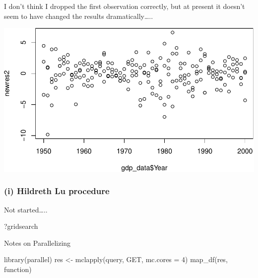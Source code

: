 \documentclass[11pt,]{article}
\newenvironment{Shaded}{\begin{snugshade}}{\end{snugshade}}
\newcommand{\KeywordTok}[1]{\textcolor[rgb]{0.13,0.29,0.53}{\textbf{#1}}}
\newcommand{\StringTok}[1]{\textcolor[rgb]{0.31,0.60,0.02}{#1}}
\newcommand{\CommentTok}[1]{\textcolor[rgb]{0.56,0.35,0.01}{\textit{#1}}}
\newcommand{\OperatorTok}[1]{\textcolor[rgb]{0.81,0.36,0.00}{\textbf{#1}}}
\newcommand{\NormalTok}[1]{#1}
\begin{document}
\begin{Shaded}
\end{Shaded}

I don't think I dropped the first observation correctly, but at present
it doesn't seem to have changed the results dramatically\ldots{}..

\begin{Shaded}
\end{Shaded}

\includegraphics{ps4_code_files/figure-latex/plot CO results-1.pdf}

\subsubsection{(i) Hildreth Lu procedure}\label{i-hildreth-lu-procedure}

Not started\ldots{}..

?gridsearch

Notes on Parallelizing

library(parallel) res \textless{}- mclapply(query, GET, mc.cores = 4)
map\_df(res, function)
\end{document}

